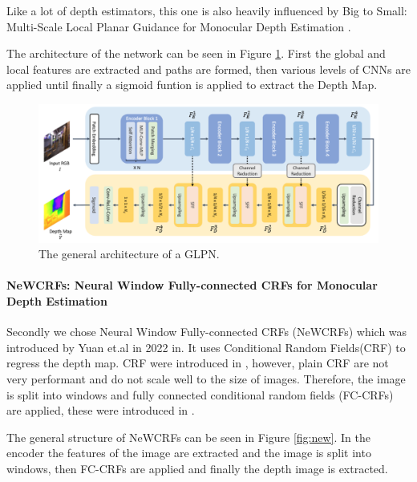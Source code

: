 Like a lot of depth estimators, this one is also heavily influenced by Big to Small: Multi-Scale Local Planar Guidance for Monocular Depth Estimation \cite{bts}.

The architecture of the network can be seen in Figure \ref{fig:glpn}. First the global and local features are extracted and paths are formed, then various levels of CNNs are applied until finally a sigmoid funtion is applied to extract the Depth Map.

\begin{figure}
    \centering
    \includegraphics[width=\linewidth]{figures/Monocular_depth/glpn.png}
    \caption{The general architecture of a GLPN.}
    \label{fig:glpn}
\end{figure}


\paragraph{NeWCRFs: Neural Window Fully-connected CRFs for Monocular Depth Estimation}

Secondly we chose Neural Window Fully-connected CRFs (NeWCRFs) \cite{mono_depthestimation_newcrfs} which was introduced by Yuan et.al in 2022 in. It uses Conditional Random Fields(CRF) to regress the depth map. CRF were introduced in \cite{cfr}, however, plain CRF are not very performant and do not scale well to the size of images. Therefore, the image is split into windows and fully connected conditional random fields (FC-CRFs) are applied, these were introduced in \cite{fc-cfr}.

The general structure of NeWCRFs can be seen in Figure \ref{fig:new}. In the encoder the features of the image are extracted and the image is split into windows, then FC-CRFs are applied and finally the depth image is extracted.

